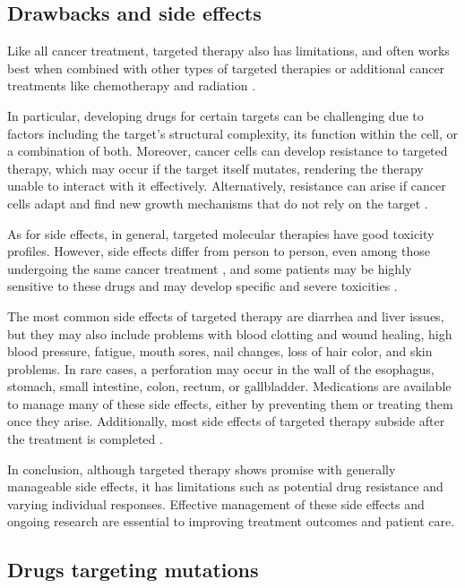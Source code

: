 \subsection{Drawbacks and side effects}

Like all cancer treatment, targeted therapy also has limitations, and often works best when combined with other types of targeted therapies or additional cancer treatments like chemotherapy and radiation \cite{target_therapy1}.

In particular, developing drugs for certain targets can be challenging due to factors including the target's structural complexity, its function within the cell, or a combination of both. Moreover, cancer cells can develop resistance to targeted therapy, which may occur if the target itself mutates, rendering the therapy unable to interact with it effectively. Alternatively, resistance can arise if cancer cells adapt and find new growth mechanisms that do not rely on the target \cite{target_therapy1}.

As for side effects, in general, targeted molecular therapies have good toxicity profiles. However, side effects differ from person to person, even among those undergoing the same cancer treatment \cite{nih_se}, and some patients may be highly sensitive to these drugs and may develop specific and severe toxicities \cite{se_tt}.

The most common side effects of targeted therapy are diarrhea and liver issues, but they may also include problems with blood clotting and wound healing, high blood pressure, fatigue, mouth sores, nail changes, loss of hair color, and skin problems. In rare cases, a perforation may occur in the wall of the esophagus, stomach, small intestine, colon, rectum, or gallbladder. Medications are available to manage many of these side effects, either by preventing them or treating them once they arise. Additionally, most side effects of targeted therapy subside after the treatment is completed \cite{target_therapy1}.

In conclusion, although targeted therapy shows promise with generally manageable side effects, it has limitations such as potential drug resistance and varying individual responses. Effective management of these side effects and ongoing research are essential to improving treatment outcomes and patient care.

\subsection{Drugs targeting mutations}

